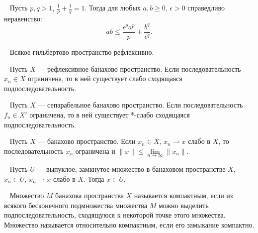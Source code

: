 \begin{lemma}
    \label{lemma:young}~\cite[с.~38]{Zeidler1990a}
    Пусть $p, q > 1$, $\frac{1}{p} + \frac{1}{q} = 1$.
    Тогда для любых $a, b \ge 0$, $\epsilon > 0$
    справедливо неравенство:
    \[
        ab \le \frac{\epsilon^p a^p}{p} + \frac{b^q}{\epsilon^q}.
    \]
\end{lemma}

\begin{lemma}
    \label{lemma:reflexive}~\cite[с.~254]{Zeidler1990a}
    Всякое гильбертово пространство рефлексивно.
\end{lemma}

\begin{lemma}
    \label{lemma:reflexive_weak}~\cite[с.~255]{Zeidler1990a}
    Пусть $X$ — рефлексивное банахово пространство.
    Если последовательность $x_n \in X$ ограничена,
    то в ней существует слабо сходящаяся подпоследовательность.
\end{lemma}

\begin{lemma}
    \label{lemma:separable_star_weak}~\cite[260]{Zeidler1990a}
    Пусть $X$ — сепарабельное банахово пространство.
    Если последовательность $f_n \in X'$ ограничена,
    то в ней существует *-слабо сходящаяся подпоследовательность.
\end{lemma}

\begin{lemma}
    \label{lemma:weak_limit}~\cite[258]{Zeidler1990a}
    Пусть $X$ — банахово пространство.
    Если $x_n \in X$, $x_n \rightharpoonup x$ слабо в $X$,
    то последовательность $x_n$ ограничена и
    $\|x\| \le \lim\limits_{n \to \infty} \|x_n\|$.
\end{lemma}

\begin{lemma}
    \label{lemma:convex_closed}~\cite[47]{Troeltzsch2010}
    Пусть $U$ — выпуклое, замкнутое множество в банаховом пространстве
    $X$, $x_n \in U$, $x_n \rightharpoonup x$ слабо в $X$.
    Тогда $x \in U$.
\end{lemma}

\begin{definition}
    \label{def:compact_set}~\cite[с.~48]{Lusternik1982}
    Множество $M$ банахова пространства $X$ называется компактным,
    если из всякого бесконечного подмножества множества $M$ можно
    выделить подпоследовательность,
    сходящуюся к некоторой точке этого множества.
    Множество называется относительно компактным,
    если его замыкание компактно.
\end{definition}

